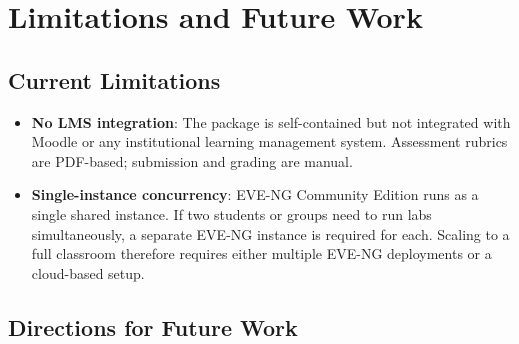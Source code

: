 \section{Limitations and Future Work}

\subsection{Current Limitations}

\begin{itemize}
    \item \textbf{No LMS integration}: The package is self-contained but not
          integrated with Moodle or any institutional learning management system.
          Assessment rubrics are PDF-based; submission and grading are manual.

    \item \textbf{Single-instance concurrency}: EVE-NG Community Edition runs as a
          single shared instance. If two students or groups need to run labs simultaneously,
          a separate EVE-NG instance is required for each. Scaling to a full classroom
          therefore requires either multiple EVE-NG deployments or a cloud-based setup.
\end{itemize}

\subsection{Directions for Future Work}

